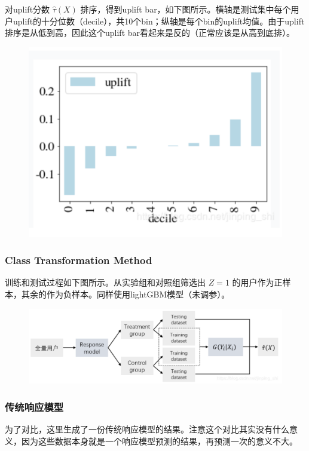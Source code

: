 \documentclass[12pt]{article}
\begin{document}
对uplift分数 $\hat{\tau}(X)$ 排序，得到uplift bar，如下图所示。横轴是测试集中每个用户uplift的十分位数（decile），共10个bin；纵轴是每个bin的uplift均值。由于uplift排序是从低到高，因此这个uplift bar看起来是反的（正常应该是从高到底排）。
\begin{figure}[H]
    \centering
    \includegraphics[width=.6\textwidth]{fig/CasualInference-Uplift_Model_Demo3.png}
\end{figure}

\subsubsection{Class Transformation Method}
训练和测试过程如下图所示。从实验组和对照组筛选出 $Z=1$ 的用户作为正样本，其余的作为负样本。同样使用lightGBM模型（未调参）。
\begin{figure}[H]
    \centering
    \includegraphics[width=1\textwidth]{fig/CasualInference-Uplift_Model_Demo4.png}
\end{figure}

\subsubsection{传统响应模型}
为了对比，这里生成了一份传统响应模型的结果。注意这个对比其实没有什么意义，因为这些数据本身就是一个响应模型预测的结果，再预测一次的意义不大。
\end{document}
